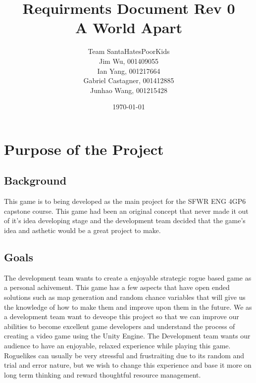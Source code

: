 \documentclass{article}
\title{Requirments Document Rev 0\\A World Apart}
\author{Team SantaHatesPoorKids
		\\ Jim Wu, 001409055
		\\ Ian Yang, 001217664
		\\ Gabriel Castagner, 001412885
		\\ Junhao Wang, 001215428
}
\date{\today}
\begin{document}
\maketitle
{}
\tableofcontents
\newpage


\section{Purpose of the Project}
\subsection{Background}

\quad This game is to being developed as the main project for the SFWR ENG 4GP6 capstone course. This game had been an original concept that never made it out of it's idea developing stage and the development team decided that the game's idea and asthetic would be a great project to make.
\subsection{Goals}
\quad The development team wants to create a enjoyable strategic rogue based game as a personal achivement. This game has a few aspects that have open ended solutions such as map generation and random chance variables that will give us the knowledge of how to make them and improve upon them in the future. We as a development team want to deveope this project so that we can improve our abilities to become excellent game developers and understand the process of creating a video game using the Unity Engine. The Development team wants our audience to have an enjoyable, relaxed experience while playing this game. Roguelikes can usually be very stressful and frustraiting due to its random and trial and error nature, but we wish to change this experience and base it more on long term thinking and reward thoughtful resource management.
\end{document}
